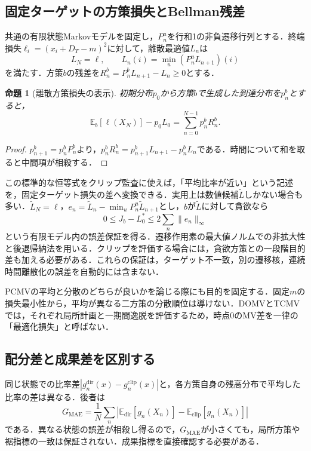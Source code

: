 \documentclass[10pt,a4paper]{article}
\numberwithin{equation}{section}
\numberwithin{table}{section}
\numberwithin{figure}{section}
\theoremstyle{plain}
\newtheorem{proposition}{命題}
\theoremstyle{definition}
\newcommand{\E}{\mathbb{E}}
\begin{document}
\subsection{固定ターゲットの方策損失とBellman残差}
共通の有限状態Markovモデルを固定し，$P_n^u$を行和1の非負遷移行列とする．終端損失$\ell_i=(x_i+D_T-m)^2$に対して，離散最適値$L_n$は
\begin{equation}
L_N=\ell,\qquad L_n(i)=\min_u(P_n^uL_{n+1})(i)
\label{eq:discreteBellman}
\end{equation}
を満たす．方策$b$の残差を$R_n^b=P_n^bL_{n+1}-L_n\geq0$とする．
\begin{proposition}[離散方策損失の表示]
初期分布$p_0$から方策$b$で生成した到達分布を$p_n^b$とすると，
\begin{equation}
\E_b[\ell(X_N)]-p_0L_0=\sum_{n=0}^{N-1}p_n^b R_n^b.
\label{eq:bellmangap}
\end{equation}
\end{proposition}
\begin{proof}
$p_{n+1}^b=p_n^bP_n^b$より，$p_n^bR_n^b=p_{n+1}^bL_{n+1}-p_n^bL_n$である．時間について和を取ると中間項が相殺する．
\end{proof}
この標準的な恒等式をクリップ監査に使えば，「平均比率が近い」という記述を，固定ターゲット損失の差へ変換できる．実用上は数値候補$\widetilde L$しかない場合も多い．$\widetilde L_N=\ell$，$e_n=\widetilde L_n-\min_uP_n^u\widetilde L_{n+1}$とし，$b$が$\widetilde L$に対して貪欲なら
\begin{equation}
0\leq J_b-L_0^*\leq2\sum_n\|e_n\|_\infty
\label{eq:resbound}
\end{equation}
という有限モデル内の誤差保証を得る．遷移作用素の最大値ノルムでの非拡大性と後退帰納法を用いる．クリップを評価する場合には，貪欲方策との一段階目的差も加える必要がある．これらの保証は，ターゲット不一致，別の遷移核，連続時間離散化の誤差を自動的には含まない．

PCMVの平均と分散のどちらが良いかを論じる際にも目的を固定する．固定$m$の損失最小性から，平均が異なる二方策の分散順位は導けない．DOMVとTCMVでは，それぞれ局所計画と一期間逸脱を評価するため，時点0のMV差を一律の「最適化損失」と呼ばない．

\subsection{配分差と成果差を区別する}
同じ状態での比率差$|g^{\mathrm{dir}}_n(x)-g^{\mathrm{clip}}_n(x)|$と，各方策自身の残高分布で平均した比率の差は異なる．後者は
\begin{equation}
G_{\mathrm{MAE}}=\frac1N\sum_n\left|\E_{\mathrm{dir}}[g_n(X_n)]-
\E_{\mathrm{clip}}[g_n(X_n)]\right|
\label{eq:gmae}
\end{equation}
である．異なる状態の誤差が相殺し得るので，$G_{\mathrm{MAE}}$が小さくても，局所方策や裾指標の一致は保証されない．成果指標を直接確認する必要がある．
\end{document}
